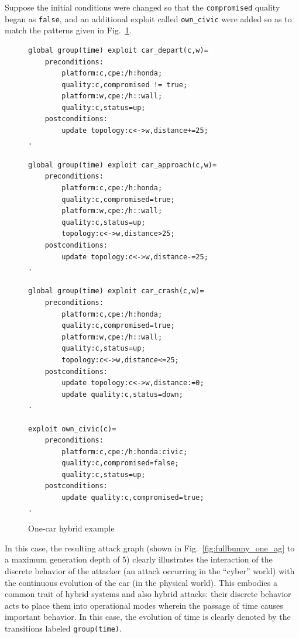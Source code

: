 Suppose the initial conditions were changed so that the \texttt{compromised}
quality began as \texttt{false}, and an additional exploit called \texttt{own\_civic}
were added so as to match the patterns given in Fig.~\ref{fig:fullbunny_one_xp}.

\begin{figure}
\begin{lstlisting}
global group(time) exploit car_depart(c,w)=
    preconditions:
        platform:c,cpe:/h:honda;
        quality:c,compromised != true;
        platform:w,cpe:/h::wall;
        quality:c,status=up;
    postconditions:
        update topology:c<->w,distance+=25;
.

global group(time) exploit car_approach(c,w)=
    preconditions:
        platform:c,cpe:/h:honda;
        quality:c,compromised=true;
        platform:w,cpe:/h::wall;
        quality:c,status=up;
        topology:c<->w,distance>25;
    postconditions:
        update topology:c<->w,distance-=25;
.

global group(time) exploit car_crash(c,w)=
    preconditions:
        platform:c,cpe:/h:honda;
        quality:c,compromised=true;
        platform:w,cpe:/h::wall;
        quality:c,status=up;
        topology:c<->w,distance<=25;
    postconditions:
        update topology:c<->w,distance:=0;
        update quality:c,status=down;
.

exploit own_civic(c)=
    preconditions:
        platform:c,cpe:/h:honda:civic;
        quality:c,compromised=false;
        quality:c,status=up;
    postconditions:
        update quality:c,compromised=true;
.
\end{lstlisting}
\caption{One-car hybrid example}
\label{fig:fullbunny_one_xp}
\end{figure}

In this case, the resulting attack graph (shown in 
Fig.~\ref{fig:fullbunny_one_ag} to a maximum generation depth of 5) clearly
illustrates the interaction of the discrete behavior of the attacker (an
attack occurring in the ``cyber'' world) with the continuous evolution of the
car (in the physical world). This embodies a common trait of hybrid systems
and also hybrid attacks: their discrete behavior acts to place them into
operational modes wherein the passage of time causes important behavior. In
this case, the evolution of time is clearly denoted by the transitions labeled
\texttt{group(time)}.

